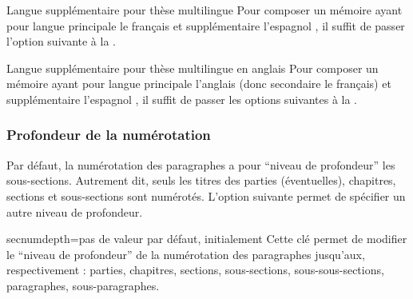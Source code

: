 \begin{dbexample}{Langue supplémentaire pour thèse
    multilingue}{}
  Pour composer un mémoire ayant pour langue principale le français et
  supplémentaire l'espagnol , il suffit de passer l'option suivante à la \yatcl{}.
\end{dbexample}

\begin{dbexample}{Langue supplémentaire pour thèse
    multilingue en anglais}{}
  Pour composer un mémoire ayant pour langue principale l'anglais (donc
  secondaire le français) et supplémentaire l'espagnol , il suffit de passer les options
  suivantes à la \yatcl{}.
\end{dbexample}

\subsubsection{Profondeur de la numérotation}\label{sec:profondeur-de-la}

Par défaut, la numérotation des paragraphes a pour \enquote{niveau de
  profondeur} les sous-sections. Autrement dit, seuls les titres des parties
(éventuelles), chapitres, sections et sous-sections sont numérotés.  L'option
 suivante permet de spécifier un autre niveau de
profondeur.
%
{%
  \begin{docKey}{secnumdepth}{=\textbar{}\textbar{}\textbar{}\textbar{}\textbar{}\textbar{}}{pas
      de valeur par défaut, initialement }
    Cette clé permet de modifier le \enquote{niveau de profondeur} de la
    numérotation des paragraphes jusqu'aux, respectivement : parties,
    chapitres, sections, sous-sections, sous-sous-sections, paragraphes,
    sous-paragraphes.
  \end{docKey}
}

